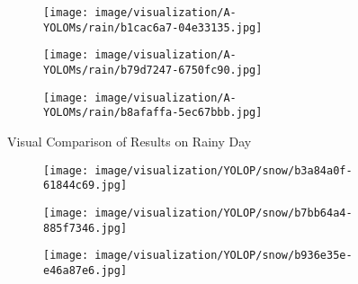 \documentclass[lettersize,journal]{IEEEtran}
\begin{document}
{\begin{figure*}[!h]
    \begin{subfigure}[b]{0.05\textwidth}
        \centering
        \vspace{0.1cm}
    \end{subfigure}\begin{subfigure}{0.25\textwidth}
        \centering
        \texttt{[image: image/visualization/A-YOLOMs/rain/b1cac6a7-04e33135.jpg]}
    \end{subfigure}\hspace{0.5cm}
    \begin{subfigure}{0.25\textwidth}
        \centering
        \texttt{[image: image/visualization/A-YOLOMs/rain/b79d7247-6750fc90.jpg]}
    \end{subfigure}\hspace{0.5cm}
    \begin{subfigure}{0.25\textwidth}
        \centering
        \texttt{[image: image/visualization/A-YOLOMs/rain/b8afaffa-5ec67bbb.jpg]}
    \end{subfigure}
    \caption{Visual Comparison of Results on Rainy Day}
    \label{fig:rainy_day_comparison}
\end{figure*}


\begin{figure*}[!h]
    \centering
    \begin{subfigure}[b]{0.05\textwidth}
        \centering
        \vspace{0.6cm} 
    \end{subfigure}\begin{subfigure}{0.25\textwidth}
        \centering
        \texttt{[image: image/visualization/YOLOP/snow/b3a84a0f-61844c69.jpg]}
    \end{subfigure}\hspace{0.5cm}
    \begin{subfigure}{0.25\textwidth}
        \centering
        \texttt{[image: image/visualization/YOLOP/snow/b7bb64a4-885f7346.jpg]}
    \end{subfigure}\hspace{0.5cm}
    \begin{subfigure}{0.25\textwidth}
        \centering
        \texttt{[image: image/visualization/YOLOP/snow/b936e35e-e46a87e6.jpg]}
    \end{subfigure}
    
    \medskip


\end{figure*}}
\end{document}
